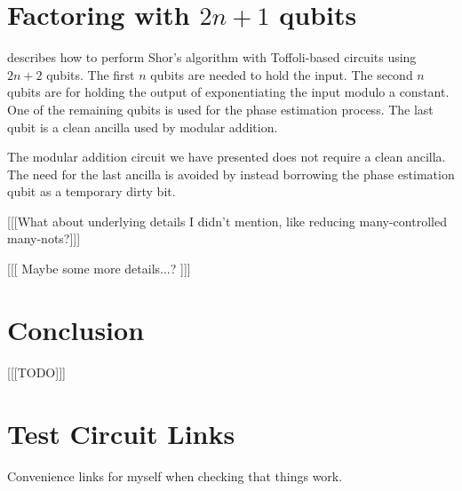 \documentclass[twocolumn]{article}
\begin{document}
\section{Factoring with $2n+1$ qubits} \label{sec:applications}

\cite{haner2016} describes how to perform Shor's algorithm with Toffoli-based circuits using $2n+2$ qubits.
The first $n$ qubits are needed to hold the input.
The second $n$ qubits are for holding the output of exponentiating the input modulo a constant.
One of the remaining qubits is used for the phase estimation process.
The last qubit is a clean ancilla used by modular addition.

The modular addition circuit we have presented does not require a clean ancilla.
The need for the last ancilla is avoided by instead borrowing the phase estimation qubit as a temporary dirty bit.

[[[What about underlying details I didn't mention, like reducing many-controlled many-nots?]]]

[[[ Maybe some more details...? ]]]

\section{Conclusion} \label{sec:conclusion}

[[[TODO]]]




\section{Test Circuit Links}

Convenience links for myself when checking that things work.
\end{document}
